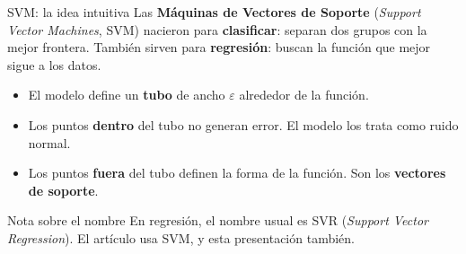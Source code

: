 \documentclass{beamer}
\begin{document}
\begin{frame}{SVM: la idea intuitiva}
    \justifying\small
    Las \textbf{Máquinas de Vectores de Soporte} (\textit{Support Vector Machines}, SVM) nacieron para \textbf{clasificar}: separan dos grupos con la mejor frontera. También sirven para \textbf{regresión}: buscan la función que mejor sigue a los datos.
    \medskip

    \begin{itemize}
        \item El modelo define un \textbf{tubo} de ancho $\varepsilon$ alrededor de la función.
        \item Los puntos \textbf{dentro} del tubo no generan error. El modelo los trata como ruido normal.
        \item Los puntos \textbf{fuera} del tubo definen la forma de la función. Son los \textbf{vectores de soporte}.
    \end{itemize}
    \medskip
    \begin{alertblock}{Nota sobre el nombre}
        En regresión, el nombre usual es SVR (\textit{Support Vector Regression}). El artículo usa SVM, y esta presentación también.
    \end{alertblock}
\end{frame}
\end{document}
